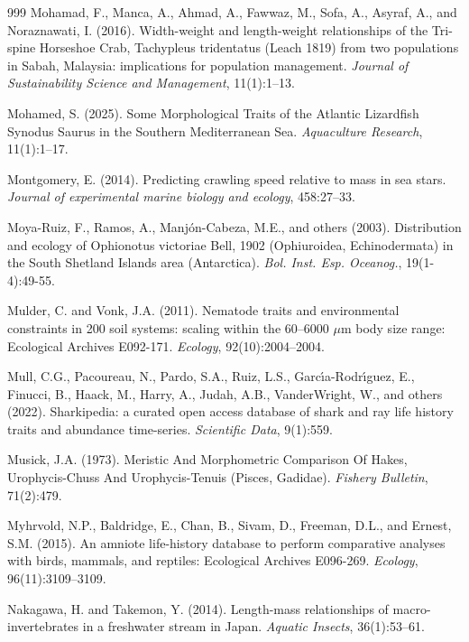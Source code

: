 \begin{thebibliography}{999}
Mohamad, F., Manca, A., Ahmad, A., Fawwaz, M., Sofa, A., Asyraf, A., and Noraznawati, I. (2016). Width-weight and length-weight relationships of the Tri-spine Horseshoe Crab, Tachypleus tridentatus (Leach 1819) from two populations in Sabah, Malaysia: implications for population management. \textit{Journal of Sustainability Science and Management}, 11(1):1--13.

Mohamed, S. (2025). Some Morphological Traits of the Atlantic Lizardfish Synodus Saurus in the Southern Mediterranean Sea. \textit{Aquaculture Research}, 11(1):1--17.

Montgomery, E. (2014). Predicting crawling speed relative to mass in sea stars. \textit{Journal of experimental marine biology and ecology}, 458:27--33.

Moya-Ruiz, F., Ramos, A., Manj{\'o}n-Cabeza, M.E., and others (2003). Distribution and ecology of Ophionotus victoriae Bell, 1902 (Ophiuroidea, Echinodermata) in the South Shetland Islands area (Antarctica). \textit{Bol. Inst. Esp. Oceanog.}, 19(1-4):49-55.

Mulder, C. and Vonk, J.A. (2011). Nematode traits and environmental constraints in 200 soil systems: scaling within the 60--6000 $\mu$m body size range: Ecological Archives E092-171. \textit{Ecology}, 92(10):2004--2004.

Mull, C.G., Pacoureau, N., Pardo, S.A., Ruiz, L.S., Garc{\'\i}a-Rodr{\'\i}guez, E., Finucci, B., Haack, M., Harry, A., Judah, A.B., VanderWright, W., and others (2022). Sharkipedia: a curated open access database of shark and ray life history traits and abundance time-series. \textit{Scientific Data}, 9(1):559.

Musick, J.A. (1973). Meristic And Morphometric Comparison Of Hakes, Urophycis-Chuss And Urophycis-Tenuis (Pisces, Gadidae). \textit{Fishery Bulletin}, 71(2):479.

Myhrvold, N.P., Baldridge, E., Chan, B., Sivam, D., Freeman, D.L., and Ernest, S.M. (2015). An amniote life-history database to perform comparative analyses with birds, mammals, and reptiles: Ecological Archives E096-269. \textit{Ecology}, 96(11):3109--3109.

Nakagawa, H. and Takemon, Y. (2014). Length-mass relationships of macro-invertebrates in a freshwater stream in Japan. \textit{Aquatic Insects}, 36(1):53--61.


\end{thebibliography}
